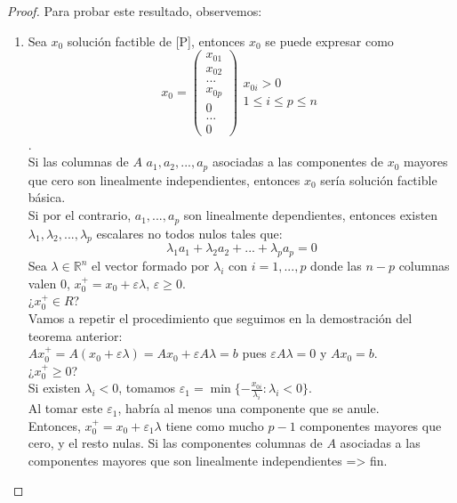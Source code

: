 \documentclass[11pt,fleqn]{book} %
\begin{document}
\begin{proof}
	Para probar este resultado, observemos: 
\begin{enumerate}
	\item Sea $x_0$ solución factible de [P], entonces $x_0$ se puede expresar como \\
	$$x_0=\left(\begin{array}{c}
	x_{01} \\
	x_{02} \\
	... \\
	x_{0p} \\
	0 \\
	... \\
	0
	\end{array}\right) 
	\begin{array}{c}
	x_{0i}>0\\
	1 \leq i \leq p \leq n
	\end{array}
	$$. \\
	Si las columnas de $A$ $a_1, a_2, ..., a_p$ asociadas a las componentes de $x_0$ mayores que cero son linealmente independientes, entonces $x_0$ sería solución factible básica. 	  \\
	Si por el contrario, $a_1, ..., a_p$ son linealmente dependientes, entonces existen $\lambda_1, \lambda_2, ..., \lambda_p$ escalares no todos nulos tales que:
	$$
		\lambda_1 a_1+\lambda_2 a_2+ ... + \lambda_p a_p=0
	$$
	Sea $\lambda \in \mathbb{R}^n$ el vector formado por $\lambda_i$ con $i=1,...,p$ donde las $n-p$ columnas valen $0$, $x_0^+=x_0+\varepsilon\lambda$, $\varepsilon \geq 0$. \\
	¿$x_0^+ \in R$? \\
	Vamos a repetir el procedimiento que seguimos en la demostración del teorema anterior: \\
	$Ax_0^+=A(x_0+\varepsilon \lambda )=Ax_0+\varepsilon A \lambda=b$ pues $\varepsilon A \lambda=0$ y $Ax_0=b$. \\
	¿$x_0^+ \geq 0$? \\
	Si existen $\lambda_i < 0$, tomamos $\varepsilon_1= \min\{-\frac{x_{0i}}{\lambda_i} : \lambda_i < 0\}$. \\
	Al tomar este $\varepsilon_1$, habría al menos una componente que se anule. \\
	Entonces, $x_0^+=x_0+\varepsilon_1 \lambda$ tiene como mucho $p-1$ componentes mayores que cero, y el resto nulas. Si las componentes columnas de $A$ asociadas a las componentes mayores que son linealmente independientes => fin. \\

\end{enumerate}
\end{proof}
\end{document}
